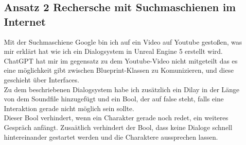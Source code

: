 \subsection{Ansatz 2 Rechersche mit Suchmaschienen im Internet}
Mit der Suchmaschiene Google bin ich auf ein Video auf Youtube gestoßen, was mir erklärt hat wie ich ein Dialogsystem in Unreal Engine 5 erstellt wird.
\\
ChatGPT hat mir im gegensatz zu dem Youtube-Video nicht mitgeteilt das es eine möglichkeit gibt zwischen Blueprint-Klassen zu Komunizieren, und diese geschieht über Interfaces.
\\
Zu dem beschriebenen Dialogsystem habe ich zusätzlich ein Dilay in der Länge von dem Soundfile hinzugefügt und ein Bool, der auf false steht, falls eine Interaktion gerade nicht möglich sein sollte.
\\
Dieser Bool verhindert, wenn ein Charakter gerade noch redet, ein weiteres Gespräch anfängt. Zusaätlich verhindert der Bool, dass keine Dialoge schnell hintereinander gestartet werden und die Charaktere aussprechen lassen.

